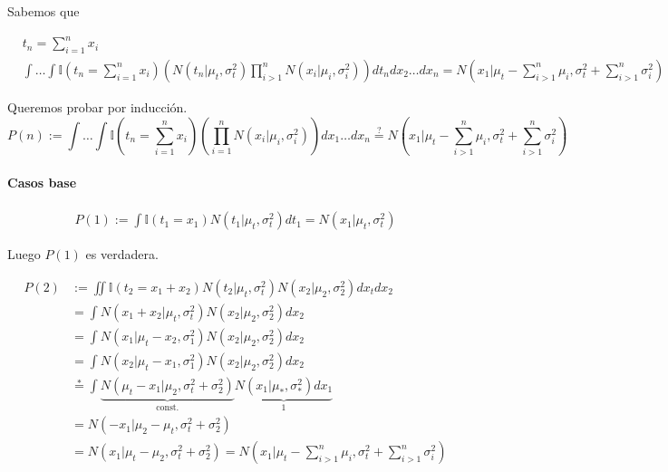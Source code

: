 \documentclass[11pt,twoside,spanish]{report} %
\begin{document}
Sabemos que

\begin{equation}
	\begin{split}
		&t_n = \sum_{i=1}^n x_i\\
		&\int \dots \int \mathbb{I}(t_n= \sum_{i=1}^n x_i ) \left( N(t_n|\mu_t,\sigma_t^2)\prod_{i>1}^n N(x_i|\mu_i,\sigma_i^2) \right) dt_ndx_2 \dots dx_n =  N\left(x_1|\mu_t-\sum_{i>1}^n \mu_i,\sigma_t^2+\sum_{i>1}^n\sigma_i^2\right)
	\end{split}
\end{equation}


Queremos probar por inducci\'on.
\begin{equation}
	P(n):= \int \dots \int \mathbb{I}(t_n= \sum_{i=1}^n x_i ) \left( \prod_{i=1}^n N(x_i|\mu_i,\sigma_i^2) \right) dx_1 \dots dx_n \overset{?}{=} N\left(x_1|\mu_t-\sum_{i>1}^n \mu_i,\sigma_t^2+\sum_{i>1}^n\sigma_i^2\right)
\end{equation}

\paragraph{Casos base}

\begin{equation}
	\begin{split}
		P(1) := \int \mathbb{I}(t_1 = x_1) N(t_1|\mu_t,\sigma_t^2) dt_1 = N(x_1|\mu_t,\sigma_t^2)
	\end{split}
\end{equation}

Luego $P(1)$ es verdadera.

\begin{equation}
	\begin{split}
		P(2) & := \iint \mathbb{I}(t_2 = x_1 + x_2) N(t_2|\mu_t, \sigma_t^2)N(x_2|\mu_2, \sigma_2^2) dx_tdx_2 \\
		&= \int N( x_1 + x_2|\mu_t, \sigma_t^2) N(x_2|\mu_2, \sigma_2^2) dx_2   \\
		& = \int N(x_1|\mu_t-x_2, \sigma_1^2) N(x_2| \mu_2, \sigma_2^2) dx_2 \\
		& = \int N(x_2|\mu_t-x_1, \sigma_1^2) N(x_2| \mu_2, \sigma_2^2) dx_2 \\
		& \overset{*}{=} \int \underbrace{N(\mu_t-x_1|\mu_2,\sigma_t^2 + \sigma_2^2)}_{\text{const.}} \underbrace{N(x_1|\mu_{*},\sigma_{*}^2) dx_1}_{1} \\
		& = N(-x_1|\mu_2-\mu_t,\sigma_t^2 + \sigma_2^2)\\
		& = N(x_1|\mu_t-\mu_2,\sigma_t^2 + \sigma_2^2) = N(x_1|\mu_t-\sum_{i>1}^n \mu_i,\sigma_t^2+\sum_{i>1}^n \sigma_i^2 )
	\end{split}
\end{equation}
\end{document}
